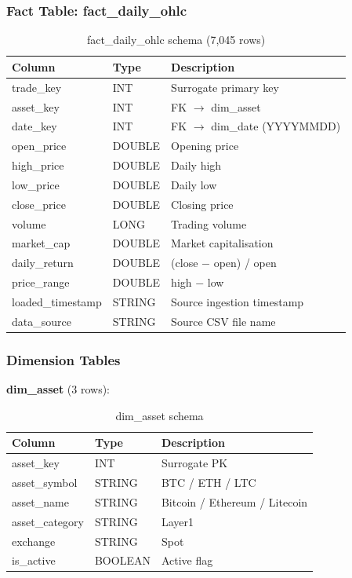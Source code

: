 \documentclass[a4paper]{article}
\begin{document}
\subsubsection{Fact Table: fact\_daily\_ohlc}

\begin{table}[H]
\centering
\begin{tabular}{|l|l|l|}
\hline
\textbf{Column} & \textbf{Type} & \textbf{Description} \\
\hline
trade\_key & INT & Surrogate primary key \\
\hline
asset\_key & INT & FK $\rightarrow$ dim\_asset \\
\hline
date\_key & INT & FK $\rightarrow$ dim\_date (YYYYMMDD) \\
\hline
open\_price & DOUBLE & Opening price \\
\hline
high\_price & DOUBLE & Daily high \\
\hline
low\_price & DOUBLE & Daily low \\
\hline
close\_price & DOUBLE & Closing price \\
\hline
volume & LONG & Trading volume \\
\hline
market\_cap & DOUBLE & Market capitalisation \\
\hline
daily\_return & DOUBLE & (close $-$ open) / open \\
\hline
price\_range & DOUBLE & high $-$ low \\
\hline
loaded\_timestamp & STRING & Source ingestion timestamp \\
\hline
data\_source & STRING & Source CSV file name \\
\hline
\end{tabular}
\caption{fact\_daily\_ohlc schema (7,045 rows)}
\end{table}

\subsubsection{Dimension Tables}

\textbf{dim\_asset} (3 rows):
\begin{table}[H]
\centering
\begin{tabular}{|l|l|l|}
\hline
\textbf{Column} & \textbf{Type} & \textbf{Description} \\
\hline
asset\_key & INT & Surrogate PK \\
\hline
asset\_symbol & STRING & BTC / ETH / LTC \\
\hline
asset\_name & STRING & Bitcoin / Ethereum / Litecoin \\
\hline
asset\_category & STRING & Layer1 \\
\hline
exchange & STRING & Spot \\
\hline
is\_active & BOOLEAN & Active flag \\
\hline
\end{tabular}
\caption{dim\_asset schema}
\end{table}
\end{document}
